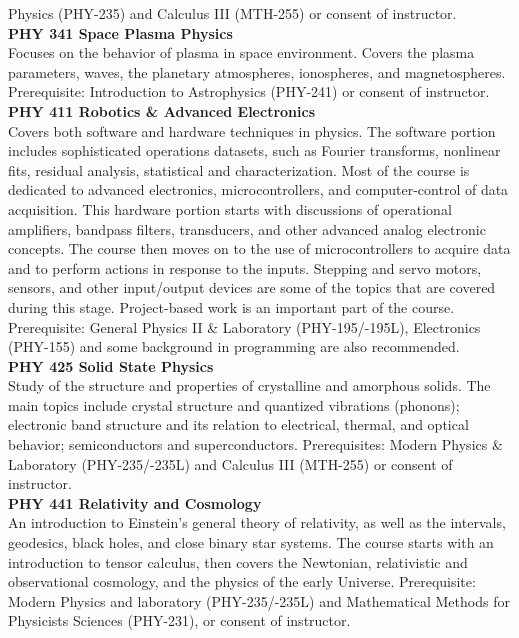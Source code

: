 \documentclass[
  letterpaper,
]{scrbook}
\begin{document}
Physics (PHY-235) and Calculus III (MTH-255) or consent of instructor.\\
\textbf{PHY 341 Space Plasma Physics}\\
Focuses on the behavior of plasma in space environment. Covers the
plasma parameters, waves, the planetary atmospheres, ionospheres, and
magnetospheres. Prerequisite: Introduction to Astrophysics (PHY-241) or
consent of instructor.\\
\textbf{PHY 411 Robotics \& Advanced Electronics}\\
Covers both software and hardware techniques in physics. The software
portion includes sophisticated operations datasets, such as Fourier
transforms, nonlinear fits, residual analysis, statistical and
characterization. Most of the course is dedicated to advanced
electronics, microcontrollers, and computer-control of data acquisition.
This hardware portion starts with discussions of operational amplifiers,
bandpass filters, transducers, and other advanced analog electronic
concepts. The course then moves on to the use of microcontrollers to
acquire data and to perform actions in response to the inputs. Stepping
and servo motors, sensors, and other input/output devices are some of
the topics that are covered during this stage. Project-based work is an
important part of the course. Prerequisite: General Physics II \&
Laboratory (PHY-195/-195L), Electronics (PHY-155) and some background in
programming are also recommended.\\
\textbf{PHY 425 Solid State Physics}\\
Study of the structure and properties of crystalline and amorphous
solids. The main topics include crystal structure and quantized
vibrations (phonons); electronic band structure and its relation to
electrical, thermal, and optical behavior; semiconductors and
superconductors. Prerequisites: Modern Physics \& Laboratory
(PHY-235/-235L) and Calculus III (MTH-255) or consent of instructor.\\
\textbf{PHY 441 Relativity and Cosmology}\\
An introduction to Einstein's general theory of relativity, as well as
the intervals, geodesics, black holes, and close binary star systems.
The course starts with an introduction to tensor calculus, then covers
the Newtonian, relativistic and observational cosmology, and the physics
of the early Universe. Prerequisite: Modern Physics and laboratory
(PHY-235/-235L) and Mathematical Methods for Physicists Sciences
(PHY-231), or consent of instructor.\\
\end{document}
